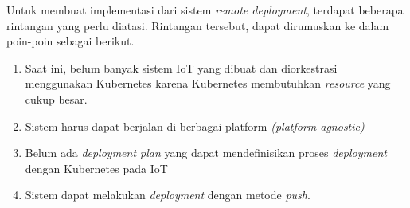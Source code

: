 Untuk membuat implementasi dari sistem \textit{remote deployment}, terdapat beberapa rintangan yang perlu diatasi. Rintangan tersebut, dapat dirumuskan ke dalam poin-poin sebagai berikut.

\begin{enumerate}
  \item Saat ini, belum banyak sistem IoT yang dibuat dan diorkestrasi menggunakan Kubernetes karena Kubernetes membutuhkan \textit{resource} yang cukup besar.
  \item Sistem harus dapat berjalan di berbagai platform \textit{(platform agnostic)}
  \item Belum ada \textit{deployment plan} yang dapat mendefinisikan proses \textit{deployment} dengan Kubernetes pada IoT
  \item Sistem dapat melakukan \textit{deployment} dengan metode \textit{push}.
\end{enumerate}

